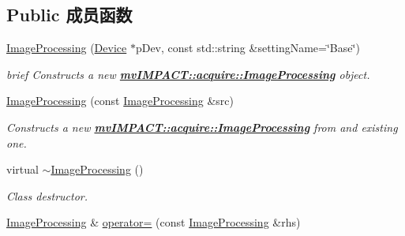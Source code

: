 \subsection*{Public 成员函数}
\begin{DoxyCompactItemize}
\item 
\hyperlink{classmv_i_m_p_a_c_t_1_1acquire_1_1_image_processing_a81a81cdfd896ef8ceaead6f93b88038a}{Image\+Processing} (\hyperlink{classmv_i_m_p_a_c_t_1_1acquire_1_1_device}{Device} $\ast$p\+Dev, const std\+::string \&setting\+Name=\char`\"{}Base\char`\"{})
\begin{DoxyCompactList}\small\item\em brief Constructs a new {\bfseries \hyperlink{classmv_i_m_p_a_c_t_1_1acquire_1_1_image_processing}{mv\+I\+M\+P\+A\+C\+T\+::acquire\+::\+Image\+Processing}} object. \end{DoxyCompactList}\item 
\hyperlink{classmv_i_m_p_a_c_t_1_1acquire_1_1_image_processing_a9476f886daf74017358ba91efed60a83}{Image\+Processing} (const \hyperlink{classmv_i_m_p_a_c_t_1_1acquire_1_1_image_processing}{Image\+Processing} \&src)
\begin{DoxyCompactList}\small\item\em Constructs a new {\bfseries \hyperlink{classmv_i_m_p_a_c_t_1_1acquire_1_1_image_processing}{mv\+I\+M\+P\+A\+C\+T\+::acquire\+::\+Image\+Processing}} from and existing one. \end{DoxyCompactList}\item 
\hypertarget{classmv_i_m_p_a_c_t_1_1acquire_1_1_image_processing_a41bd628190fbbc91e76a3f81d73b2758}{virtual \hyperlink{classmv_i_m_p_a_c_t_1_1acquire_1_1_image_processing_a41bd628190fbbc91e76a3f81d73b2758}{$\sim$\+Image\+Processing} ()}\label{classmv_i_m_p_a_c_t_1_1acquire_1_1_image_processing_a41bd628190fbbc91e76a3f81d73b2758}

\begin{DoxyCompactList}\small\item\em Class destructor. \end{DoxyCompactList}\item 
\hypertarget{classmv_i_m_p_a_c_t_1_1acquire_1_1_image_processing_a7ac759ddd44515fd4bf400ae77eb1faf}{\hyperlink{classmv_i_m_p_a_c_t_1_1acquire_1_1_image_processing}{Image\+Processing} \& \hyperlink{classmv_i_m_p_a_c_t_1_1acquire_1_1_image_processing_a7ac759ddd44515fd4bf400ae77eb1faf}{operator=} (const \hyperlink{classmv_i_m_p_a_c_t_1_1acquire_1_1_image_processing}{Image\+Processing} \&rhs)}\label{classmv_i_m_p_a_c_t_1_1acquire_1_1_image_processing_a7ac759ddd44515fd4bf400ae77eb1faf}


\end{DoxyCompactItemize}
